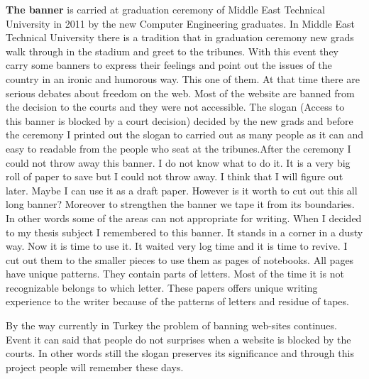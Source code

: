 
\textbf{The banner} is carried at graduation ceremony of Middle East Technical University in 2011 by the new Computer Engineering graduates. In Middle East Technical University there is a tradition that in graduation ceremony new grads walk through in the stadium and greet to the tribunes. With this event they carry some banners to express their feelings and point out the issues of the country in an ironic and humorous way. This one of them. At that time there are serious debates about freedom on the web. Most of the website are banned from the decision to the courts and they were not accessible. The slogan (Access to this banner is blocked by a court decision) decided by the new grads and before the ceremony I printed out the slogan to carried out as many people as it can and easy to readable from the people who seat at the tribunes.After the ceremony I could not throw away this banner. I do not know what to do it. It is a very big roll of paper to save but I could not throw away. I think that I will figure out later. Maybe I can use it as a draft paper. However is it worth to cut out this all long banner? Moreover to strengthen the banner we tape it from its boundaries. In other words some of the areas can not appropriate for writing. When I decided to my thesis subject I remembered to this banner. It stands in a corner in a dusty way. Now it is time to use it. It waited very log time and it is time to revive. I cut out them to the smaller pieces to use them as pages of notebooks. All pages have unique patterns. They contain parts of letters. Most of the time it is not recognizable belongs to which letter. These papers offers unique writing experience to the writer because of the patterns of letters and residue of tapes.

By the way currently in Turkey the problem of banning web-sites continues. Event it can said that people do not surprises when a website is blocked by the courts. In other words still the slogan preserves its significance and through this project people will remember these days.

